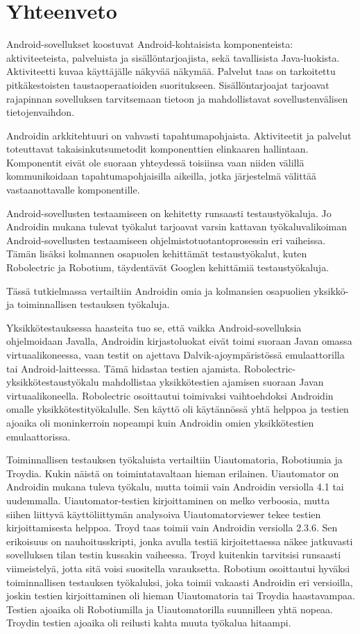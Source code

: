 \section{Yhteenveto}

Android-sovellukset koostuvat Android-kohtaisista komponenteista: aktiviteeteista, palveluista ja sisällöntarjoajista, sekä tavallisista Java-luokista. Aktiviteetti kuvaa käyttäjälle näkyvää näkymää. Palvelut taas on tarkoitettu pitkäkestoisten taustaoperaatioiden suoritukseen. Sisällöntarjoajat tarjoavat rajapinnan sovelluksen tarvitsemaan tietoon ja mahdollistavat sovellustenvälisen tietojenvaihdon.

Androidin arkkitehtuuri on vahvasti tapahtumapohjaista. Aktiviteetit ja palvelut toteuttavat takaisinkutsumetodit komponenttien elinkaaren hallintaan. Komponentit eivät ole suoraan yhteydessä toisiinsa vaan niiden välillä kommunikoidaan tapahtumapohjaisilla aikeilla, jotka järjestelmä välittää vastaanottavalle komponentille.

Android-sovellusten testaamiseen on kehitetty runsaasti testaustyökaluja. Jo Androidin mukana tulevat työkalut tarjoavat varsin kattavan työkaluvalikoiman Android-sovellusten testaamiseen ohjelmistotuotantoprosessin eri vaiheissa. Tämän lisäksi kolmannen osapuolen kehittämät testaustyökalut, kuten Robolectric ja Robotium, täydentävät Googlen kehittämiä testaustyökaluja.

Tässä tutkielmassa vertailtiin Androidin omia ja kolmansien osapuolien yksikkö- ja toiminnallisen testauksen työkaluja.

Yksikkötestauksessa haasteita tuo se, että vaikka Android-sovelluksia ohjelmoidaan Javalla, Androidin kirjastoluokat eivät toimi suoraan Javan omassa virtuaalikoneessa, vaan testit on ajettava Dalvik-ajoympäristössä emulaattorilla tai Android-laitteessa. Tämä hidastaa testien ajamista. Robolectric-yksikkötestaustyökalu mahdollistaa yksikkötestien ajamisen suoraan Javan virtuaalikoneella. Robolectric osoittautui toimivaksi vaihtoehdoksi Androidin omalle yksikkötestityökalulle. Sen käyttö oli käytännössä yhtä helppoa ja testien ajoaika oli moninkerroin nopeampi kuin Androidin omien yksikkötestien emulaattorissa.

Toiminnallisen testauksen työkaluista vertailtiin Uiautomatoria, Robotiumia ja Troydia. Kukin näistä on toimintatavaltaan hieman erilainen. Uiautomator on Androidin mukana tuleva työkalu, mutta toimii vain Androidin versiolla 4.1 tai uudemmalla. Uiautomator-testien kirjoittaminen on melko verboosia, mutta siihen liittyvä käyttöliittymän analysoiva Uiautomatorviewer tekee testien kirjoittamisesta helppoa. Troyd taas toimii vain Androidin versiolla 2.3.6. Sen erikoisuus on nauhoitusskripti, jonka avulla testiä kirjoitettaessa näkee jatkuvasti sovelluksen tilan testin kussakin vaiheessa. Troyd kuitenkin tarvitsisi runsaasti viimeistelyä, jotta sitä voisi suositella varauksetta. Robotium osoittautui hyväksi toiminnallisen testauksen työkaluksi, joka toimii vakaasti Androidin eri versioilla, joskin testien kirjoittaminen oli hieman Uiautomatoria tai Troydia haastavampaa. Testien ajoaika oli Robotiumilla ja Uiautomatorilla suunnilleen yhtä nopeaa. Troydin testien ajoaika oli reilusti kahta muuta työkalua hitaampi.

